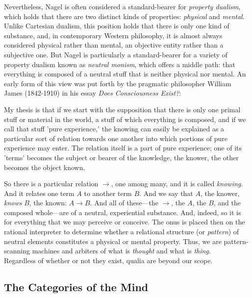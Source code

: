 Nevertheless, Nagel is often considered a standard-bearer for \textit{property dualism}, which holds that there are two distinct kinds of properties: \textit{physical} and \textit{mental}. Unlike Cartesian dualism, this position holds that there is only one kind of substance, and, in contemporary Western philosophy, it is almost always considered physical rather than mental, an objective entity rather than a subjective one. But Nagel is particularly a standard-bearer for a variety of property dualism known as \textit{neutral monism}, which offers a middle path: that everything is composed of a neutral stuff that is neither physical nor mental. An early form of this view was put forth by the pragmatic philosopher William James (1842-1910) in his essay \textit{Does Consciousness Exist?}: \\
        
\begin{displayquote}
    My thesis is that if we start with the supposition that there is only one primal stuff or material in the world, a stuff of which everything is composed, and if we call that stuff 'pure experience,' the knowing can easily be explained as a particular sort of relation towards one another into which portions of pure experience may enter. The relation itself is a part of pure experience; one of its 'terms' becomes the subject or bearer of the knowledge, the knower, the other becomes the object known. \\
\end{displayquote}
        
So there is a particular relation $\rightarrow$, one among many, and it is called \textit{knowing}. And it relates one term $A$ to another term $B$. And we say that $A$, the knower, \textit{knows} $B$, the known: $A \rightarrow B$. And all of these---the $\rightarrow$, the $A$, the $B$, and the composed whole---are of a neutral, experiential substance. And, indeed, so it is for everything that we may perceive or conceive. The onus is placed then on the rational interpreter to determine whether a relational structure (or \textit{pattern}) of neutral elements constitutes a physical or mental property. Thus, we are pattern-scanning machines and arbiters of what is \textit{thought} and what is \textit{thing}. \\
        
Regardless of whether or not they exist, qualia are beyond our scope. \\

\subsection{The Categories of the Mind}

